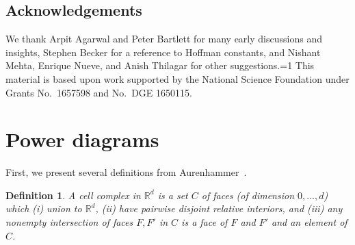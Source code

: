\documentclass[11pt]{article}
\newcommand{\Comments}{1}
\newcommand{\mytodo}[2]{\ifnum\Comments=1%
  \todo[linecolor=#1!80!black,backgroundcolor=#1,bordercolor=#1!80!black]{#2}\fi}
\newcommand{\raft}[1]{\mytodo{green!20!white}{RF: #1}}
\newcommand{\reals}{\mathbb{R}}
\newtheorem{conjecture}{Conjecture}
\newtheorem{definition}{Definition}
\begin{document}





\subsection*{Acknowledgements}
We thank Arpit Agarwal and Peter Bartlett for many early discussions and insights,
Stephen Becker for a reference to Hoffman constants,
and Nishant Mehta, Enrique Nueve, and Anish Thilagar for other suggestions.\raft{others?}
This material is based upon work supported by the National Science Foundation under Grants No.\ 1657598 and No.\ DGE 1650115.
\newpage



\appendix

\newpage
\section{Power diagrams}\label{app:power-diagrams}
First, we present several definitions from Aurenhammer~\cite{aurenhammer1987power}.
\begin{definition}\label{def:cell-complex}
  A \emph{cell complex} in $\reals^d$ is a set $C$ of faces (of dimension $0,\ldots,d$) which (i) union to $\reals^d$, (ii) have pairwise disjoint relative interiors, and (iii) any nonempty intersection of faces $F,F'$ in $C$ is a face of $F$ and $F'$ and an element of $C$.
\end{definition}
\end{document}
